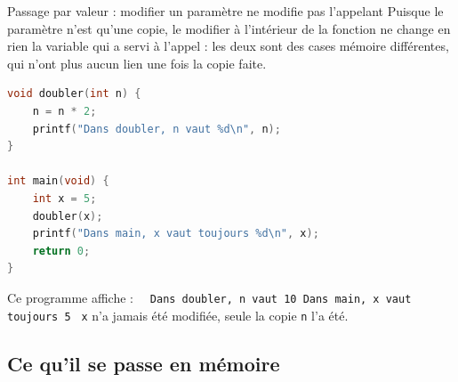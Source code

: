 \begin{UPSTIwarning}{Passage par valeur : modifier un paramètre ne modifie pas l'appelant}
  Puisque le paramètre n'est qu'une copie, le modifier à l'intérieur de la fonction ne change en rien la variable qui a servi à l'appel : les deux sont des cases mémoire différentes, qui n'ont plus aucun lien une fois la copie faite.

\begin{lstlisting}[language=c,caption={Modifier un paramètre ne modifie pas la variable de l'appelant}]
void doubler(int n) {
    n = n * 2;
    printf("Dans doubler, n vaut %d\n", n);
}

int main(void) {
    int x = 5;
    doubler(x);
    printf("Dans main, x vaut toujours %d\n", x);
    return 0;
}
\end{lstlisting}

  Ce programme affiche : \
  \texttt{
    Dans doubler, n vaut 10
    Dans main, x vaut toujours 5
  }
  \texttt{x} n'a jamais été modifiée, seule la copie \texttt{n} l'a été.
\end{UPSTIwarning}

\subsection{Ce qu'il se passe en mémoire}
